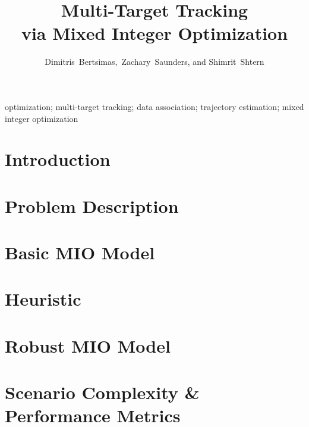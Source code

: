 \documentclass[journal]{IEEEtran}
\begin{document}
\title{Multi-Target Tracking\\ via Mixed Integer Optimization}


\author{Dimitris~Bertsimas,~Zachary~Saunders, and Shimrit~Shtern}

\maketitle

\begin{abstract}

\end{abstract}

\begin{IEEEkeywords}
optimization; multi-target tracking; data association; trajectory estimation; mixed integer optimization 
\end{IEEEkeywords}

\section{Introduction}\label{sec: Intro}


\section{Problem Description}\label{sec:Problem Description}


\section{Basic MIO Model}\label{sec:Basic MIO Model}


\section{Heuristic} \label{sec:Heuristic}


\section{Robust MIO Model}\label{sec:Robust MIO Model}


\section{Scenario Complexity \& Performance Metrics} \label{sec:Scenario-Performance}

 
\end{document}
